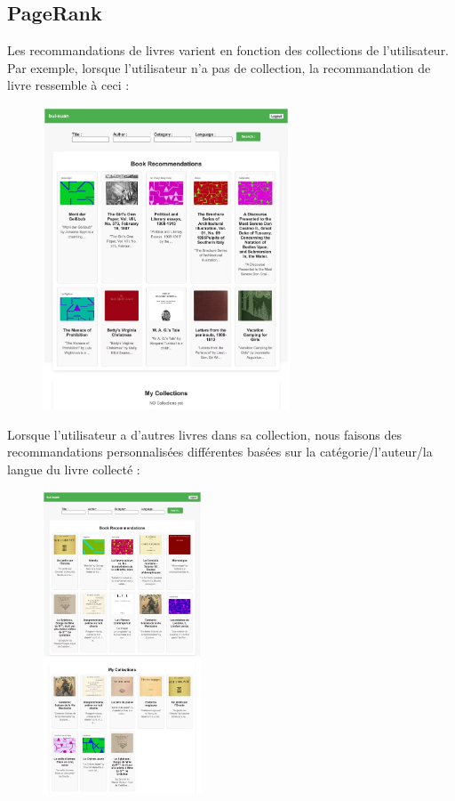 \documentclass[11pt,english]{article}
\begin{document}
{    \indent 

    \subsection{PageRank}

    \indent

    Les recommandations de livres varient en fonction des collections de l'utilisateur. Par exemple, lorsque l'utilisateur n'a pas de collection, la recommandation de livre ressemble à ceci :
    
    \begin{figure}[H]
        \begin{center}
            \includegraphics[height=9cm]{./src/Rank1.jpg}
        \end{center}
    \end{figure}

    \indent Lorsque l'utilisateur a d'autres livres dans sa collection, nous faisons des recommandations personnalisées différentes basées sur la catégorie/l'auteur/la langue du livre collecté :

    \begin{figure}[H]
        \begin{center}
            \includegraphics[height=9cm]{./src/Rank3.jpg}
        \end{center}
    \end{figure}


}
\end{document}
